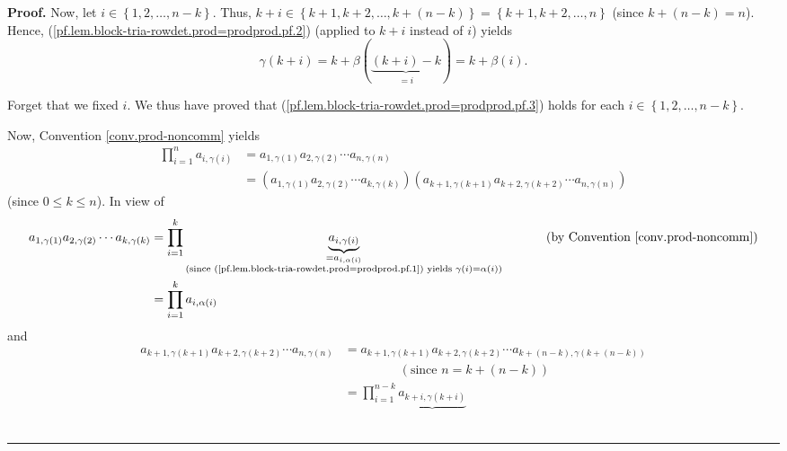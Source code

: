 \documentclass
[numbers=enddot,12pt,final,onecolumn,notitlepage,english]{scrartcl}%
\theoremstyle{definition}
\newenvironment{proof}[1][Proof]{\noindent\textbf{#1.} }{\ \rule{0.5em}{0.5em}}
\let\prodnonlimits\prod
\renewcommand{\prod}{\prodnonlimits\limits}
\newenvironment{verlong}{}{}
\begin{document}
\begin{verlong}
\begin{proof}
Now, let $i\in\left\{  1,2,\ldots,n-k\right\}  $. Thus, $k+i\in\left\{
k+1,k+2,\ldots,k+\left(  n-k\right)  \right\}  =\left\{  k+1,k+2,\ldots
,n\right\}  $ (since $k+\left(  n-k\right)  =n$). Hence,
(\ref{pf.lem.block-tria-rowdet.prod=prodprod.pf.2}) (applied to $k+i$ instead
of $i$) yields
\begin{equation}
\gamma\left(  k+i\right)  =k+\beta\left(  \underbrace{\left(  k+i\right)
-k}_{=i}\right)  =k+\beta\left(  i\right)  .
\label{pf.lem.block-tria-rowdet.prod=prodprod.pf.3}%
\end{equation}


Forget that we fixed $i$. We thus have proved that
(\ref{pf.lem.block-tria-rowdet.prod=prodprod.pf.3}) holds for each
$i\in\left\{  1,2,\ldots,n-k\right\}  $.

Now, Convention \ref{conv.prod-noncomm} yields%
\begin{align*}
\prod_{i=1}^{n}a_{i,\gamma\left(  i\right)  }  &  =a_{1,\gamma\left(
1\right)  }a_{2,\gamma\left(  2\right)  }\cdots a_{n,\gamma\left(  n\right)
}\\
&  =\left(  a_{1,\gamma\left(  1\right)  }a_{2,\gamma\left(  2\right)  }\cdots
a_{k,\gamma\left(  k\right)  }\right)  \left(  a_{k+1,\gamma\left(
k+1\right)  }a_{k+2,\gamma\left(  k+2\right)  }\cdots a_{n,\gamma\left(
n\right)  }\right)
\end{align*}
(since $0\leq k\leq n$). In view of%
\begin{align*}
a_{1,\gamma\left(  1\right)  }a_{2,\gamma\left(  2\right)  }\cdots
a_{k,\gamma\left(  k\right)  }  &  =\prod_{i=1}^{k}\underbrace{a_{i,\gamma
\left(  i\right)  }}_{\substack{=a_{i,\alpha\left(  i\right)  }\\\text{(since
(\ref{pf.lem.block-tria-rowdet.prod=prodprod.pf.1}) yields }\gamma\left(
i\right)  =\alpha\left(  i\right)  \text{)}}}\ \ \ \ \ \ \ \ \ \ \left(
\text{by Convention \ref{conv.prod-noncomm}}\right) \\
&  =\prod_{i=1}^{k}a_{i,\alpha\left(  i\right)  }%
\end{align*}
and%
\begin{align*}
a_{k+1,\gamma\left(  k+1\right)  }a_{k+2,\gamma\left(  k+2\right)  }\cdots
a_{n,\gamma\left(  n\right)  }  &  =a_{k+1,\gamma\left(  k+1\right)
}a_{k+2,\gamma\left(  k+2\right)  }\cdots a_{k+\left(  n-k\right)
,\gamma\left(  k+\left(  n-k\right)  \right)  }\\
&  \ \ \ \ \ \ \ \ \ \ \ \ \ \ \ \ \ \ \ \ \left(  \text{since }n=k+\left(
n-k\right)  \right) \\
&  =\prod_{i=1}^{n-k}\underbrace{a_{k+i,\gamma\left(  k+i\right)  }%
}
\end{align*}
\end{proof}
\end{verlong}
\end{document}
